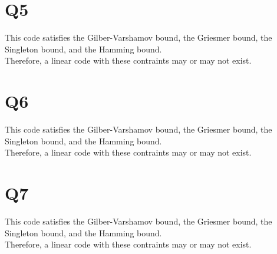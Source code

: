 \documentclass{article}
\begin{document}
\section{Q5}
This code satisfies the Gilber-Varshamov bound, the Griesmer bound, the Singleton bound, and the Hamming bound.\\
Therefore, a linear code with these contraints may or may not exist.

\section{Q6}
This code satisfies the Gilber-Varshamov bound, the Griesmer bound, the Singleton bound, and the Hamming bound.\\
Therefore, a linear code with these contraints may or may not exist.

\section{Q7}
This code satisfies the Gilber-Varshamov bound, the Griesmer bound, the Singleton bound, and the Hamming bound.\\
Therefore, a linear code with these contraints may or may not exist.
	
\end{document}
